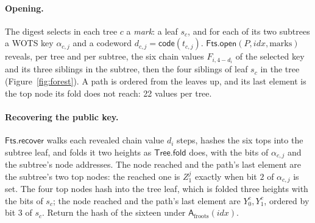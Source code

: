 \documentclass[11pt]{article}
\theoremstyle{plain}
\theoremstyle{definition}
\newcommand{\addr}{\mathsf{A}}
\newcommand{\idx}{\mathit{idx}}
\newcommand{\lut}{\mathsf{code}}
\newcommand{\TreeFold}{\mathsf{Tree.fold}}
\newcommand{\FtsOpen}{\mathsf{Fts.open}}
\newcommand{\FtsRec}{\mathsf{Fts.recover}}
\begin{document}
\paragraph{Opening.}
The digest selects in each tree $c$ a \emph{mark}: a leaf $s_c$, and for each of its two subtrees a WOTS key $\alpha_{c,j}$ and a codeword $d_{c,j}=\lut(t_{c,j})$. $\FtsOpen(P,\idx,\text{marks})$ reveals, per tree and per subtree, the six chain values $F_{i,4-d_i}$ of the selected key and its three siblings in the subtree, then the four siblings of leaf $s_c$ in the tree (Figure~\ref{fig:forest}). A path is ordered from the leaves up, and its last element is the top node its fold does not reach: 22 values per tree.

\paragraph{Recovering the public key.}
$\FtsRec$ walks each revealed chain value $d_i$ steps, hashes the six tops into the subtree leaf, and folds it two heights as $\TreeFold$ does, with the bits of $\alpha_{c,j}$ and the subtree's node addresses. The node reached and the path's last element are the subtree's two top nodes: the reached one is $Z^{j}_{1}$ exactly when bit $2$ of $\alpha_{c,j}$ is set. The four top nodes hash into the tree leaf, which is folded three heights with the bits of $s_c$; the node reached and the path's last element are $Y^{c}_{0},Y^{c}_{1}$, ordered by bit $3$ of $s_c$. Return the hash of the sixteen under $\addr_{\mathrm{froots}}(\idx)$.
\end{document}

